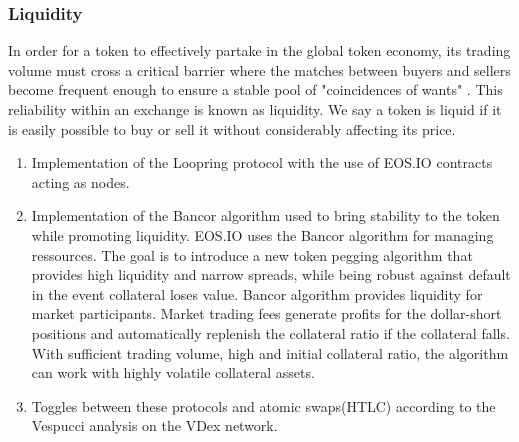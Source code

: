 \documentclass[]{article}
\begin{document}
	
	\subsubsection{Liquidity}
	In order for a token to effectively partake in the global token
	economy, its trading volume must cross a critical barrier where
	the matches between buyers and sellers become frequent enough to ensure a stable pool of "coincidences of wants" \cite{10}. 
	This reliability within an exchange is known as liquidity. We say a token is liquid if it is easily possible to buy or sell it without considerably affecting its price.
	
	\begin{enumerate} 
		\item Implementation of the Loopring protocol with the use of EOS.IO contracts acting as nodes.\cite{7}
		\item Implementation of the Bancor algorithm used to bring stability to the token while promoting liquidity.\cite{10}
		EOS.IO uses the Bancor algorithm  for managing ressources.
		The goal is to introduce a new token pegging algorithm that provides high liquidity and narrow spreads, 
		while being robust against default in the event collateral loses value. 
		Bancor algorithm provides liquidity for market participants. 
		Market trading fees generate profits for the dollar-short positions and automatically replenish the collateral ratio if the collateral falls. 
		With sufficient trading volume, high and initial collateral ratio, the algorithm can work with highly volatile collateral assets.\cite{25}
		\item Toggles between these protocols and atomic swaps(HTLC) according to the Vespucci analysis on the VDex network.
		\end{enumerate}
	
\end{document}
